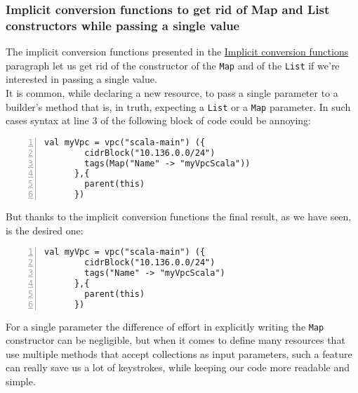 \subsubsection{Implicit conversion functions to get rid of Map and List constructors while passing a single value}
The implicit conversion functions presented in the \hyperref[sssec:implicit-converion-functions]{Implicit conversion functions} paragraph let us get rid of the constructor of the \texttt{Map} and of the \texttt{List} if we're interested in passing a single value.\\
It is common, while declaring a new resource, to pass a single parameter to a builder's method that is, in truth, expecting a \texttt{List} or a \texttt{Map} parameter.
In such cases syntax at line 3 of the following block of code could be annoying:\\
\begin{minipage}{\linewidth}
  \begin{lstlisting}[numbers=left, numberstyle=\tiny, numbersep=-5pt, stepnumber=1]
    val myVpc = vpc("scala-main") ({
        cidrBlock("10.136.0.0/24")
        tags(Map("Name" -> "myVpcScala"))
      },{
        parent(this)
      })
  \end{lstlisting}
  \end{minipage}
But thanks to the implicit conversion functions the final result, as we have seen, is the desired one:\\
\begin{minipage}{\linewidth}
  \begin{lstlisting}[numbers=left, numberstyle=\tiny, numbersep=-5pt, stepnumber=1]
    val myVpc = vpc("scala-main") ({
        cidrBlock("10.136.0.0/24")
        tags("Name" -> "myVpcScala")
      },{
        parent(this)
      })
  \end{lstlisting}
  \end{minipage}
For a single parameter the difference of effort in explicitly writing the \texttt{Map} constructor can be negligible, but when it comes to define many resources that use multiple methods that accept collections as input parameters, such a feature can really save us a lot of keystrokes, while keeping our code more readable and simple.

